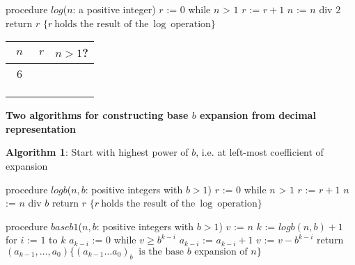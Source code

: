 \documentclass[12pt, oneside]{article}
\begin{document}


\begin{multicols}{2}
\begin{minipage}{4in}
\begin{algorithm}[caption={Algorithm for calculating integer part of $\log$}]
procedure $\textit{log}$($n$: a positive integer)
$r$ := $0$
while $n$ > $1$
  $r$ := $r + 1$
  $n$ := $n$ div $2$
return $r$ $\{ r~\textrm{holds the result of the}~\log~\textrm{operation}\} $
\end{algorithm}
\end{minipage}
\begin{center}
\begin{tabular}{c|c|c}
$n$ & $r$  & $n > 1$?\\
\hline 
~$6$~ & \phantom{~$0$~} & \phantom{~T~}\\
\phantom{$3$} & \phantom{$1$} & \phantom{T}\\
\phantom{$1$} & \phantom{$2$} & \phantom{F}\\
&\\
\end{tabular}
\end{center}
\end{multicols}

{\bf Two algorithms for constructing base $b$ expansion from decimal representation}

{\bf Algorithm 1}: Start with highest power of $b$, i.e. at left-most coefficient of expansion
\begin{multicols}{2}
\begin{algorithm}[caption={Calculating integer part of $\log_b$}]
procedure $\textit{logb}$($n, b$: positive integers with $b > 1$)
$r$ := $0$
while $n$ > $1$
  $r$ := $r + 1$
  $n$ := $n$ div $b$
return $r$ $\{ r~\textrm{holds the result of the}~\log~\textrm{operation}\}$
\end{algorithm}
\columnbreak
\begin{algorithm}[caption={Calculating base $b$ expansion, from left}]
procedure $\textit{baseb1}$($n, b$: positive integers with $b > 1$)
$v$ := $n$
$k$ := $logb(n,b) + 1$
for $i$ := $1$ to $k$
  $a_{k-i}$ := $0$
  while $v \geq b^{k-i}$
    $a_{k-i}$ := $a_{k-i} + 1$
    $v$ := $v -  b^{k-i}$
return $(a_{k-1}, \ldots, a_0) \{(a_{k-1} \ldots a_0)_b~\textrm{ is the base } b \textrm{ expansion of } n \}$
\end{algorithm}
\end{multicols}
\end{document}
